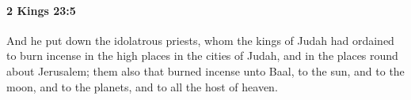 
		\paragraph{2 Kings 23:5} %
			\label{2KINGS-23-5}

			And he put down the idolatrous priests, whom the kings of Judah had ordained to burn incense in the high places in the cities of Judah, and in the places round about Jerusalem; them also that burned incense unto Baal, to the sun, and to the moon, and to the planets, and to all the host of heaven.


